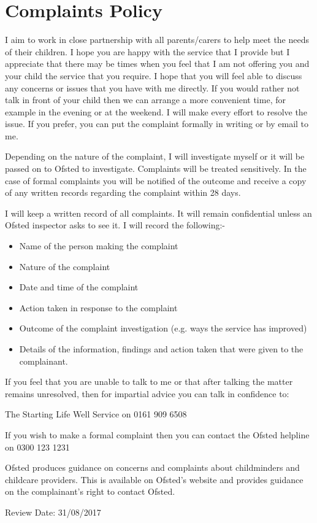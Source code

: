 

\section{Complaints Policy}

I aim to work in close partnership with all parents/carers to help meet
the needs of their children. I hope you are happy with the service that
I provide but I appreciate that there may be times when you feel that I
am not offering you and your child the service that you require. I hope
that you will feel able to discuss any concerns or issues that you have
with me directly. If you would rather not talk in front of your child
then we can arrange a more convenient time, for example in the evening
or at the weekend. I will make every effort to resolve the issue. If you
prefer, you can put the complaint formally in writing or by email to me.

Depending on the nature of the complaint, I will investigate myself or
it will be passed on to Ofsted to investigate. Complaints will be
treated sensitively. In the case of formal complaints you will be
notified of the outcome and receive a copy of any written records
regarding the complaint within 28 days.

I will keep a written record of all complaints. It will remain
confidential unless an Ofsted inspector asks to see it. I will record
the following:-

\begin{itemize}
\item
  Name of the person making the complaint~
\item
  Nature of the complaint~
\item
  Date and time of the complaint~
\item
  Action taken in response to the complaint~
\item
  Outcome of the complaint investigation (e.g. ways the service has
  improved)~
\item
  Details of the information, findings and action taken that were given
  to the complainant. ~
\end{itemize}

If you feel that you are unable to talk to me or that after talking the
matter remains unresolved, then for impartial advice you can talk in
confidence to:

The Starting Life Well Service on 0161 909 6508

If you wish to make a formal complaint then you can contact the Ofsted
helpline on 0300 123 1231

Ofsted produces guidance on concerns and complaints about childminders
and childcare providers. This is available on Ofsted's website and
provides guidance on the complainant's right to contact Ofsted.

Review Date: 31/08/2017


